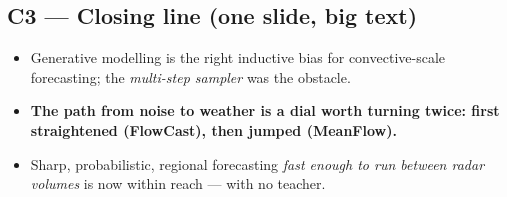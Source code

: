 \documentclass[11pt]{article}
\begin{document}
\subsection*{C3 --- Closing line (one slide, big text)}
\begin{itemize}
  \item Generative modelling is the right inductive bias for convective-scale
        forecasting; the \emph{multi-step sampler} was the obstacle.
  \item \textbf{The path from noise to weather is a dial worth turning twice:
        first straightened (FlowCast), then jumped (MeanFlow).}
  \item Sharp, probabilistic, regional forecasting \emph{fast enough to run
        between radar volumes} is now within reach --- with no teacher.
\end{itemize}
\end{document}
